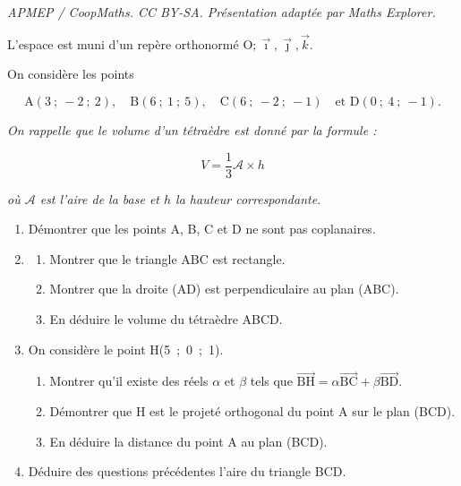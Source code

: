 \documentclass[10pt]{article}
\providecommand{\vect}[1]{\overrightarrow{#1}}
\providecommand{\Oijk}{\(\mathrm{O};\vec{\imath},\vec{\jmath},\vec{k}\)}
\begin{document}
\noindent\textit{APMEP / CoopMaths. CC BY-SA. Présentation adaptée par Maths Explorer.}\par\medskip
\medskip

L'espace est muni d'un repère orthonormé \Oijk.

On considère les points 

\[\text{A}(3~;~-2~;~2),\quad \text{B}(6~;~1~;~5),\quad \text{C}(6~;~-2~;~-1)\quad \text{et D}(0~;~4~;~-1).\]

\emph{On rappelle que le volume d'un tétraèdre est donné par la formule :}

\[V = \dfrac13 \mathcal{A} \times h\]

\emph{où $\mathcal{A}$ est l'aire de la base et $h$ la hauteur correspondante.}

\medskip

\begin{enumerate}
\item Démontrer que les points A, B, C et D ne sont pas coplanaires.
\item 
	\begin{enumerate}
		\item Montrer que le triangle ABC est rectangle.
		\item Montrer que la droite (AD) est perpendiculaire au plan (ABC).
		\item En déduire le volume du tétraèdre ABCD.
	\end{enumerate}	
\item On considère le point H(5~;~0~;~1).
	\begin{enumerate}
		\item Montrer qu'il existe des réels $\alpha$ et $\beta$ tels que $\vect{\text{BH}} = \alpha \vect{\text{BC}} + \beta \vect{\text{BD}}$.
		\item Démontrer que H est le projeté orthogonal du point A sur le plan (BCD). 
		\item En déduire la distance du point A au plan (BCD).
	\end{enumerate}	
\item Déduire des questions précédentes l'aire du triangle BCD.
\end{enumerate}

\bigskip
\end{document}
